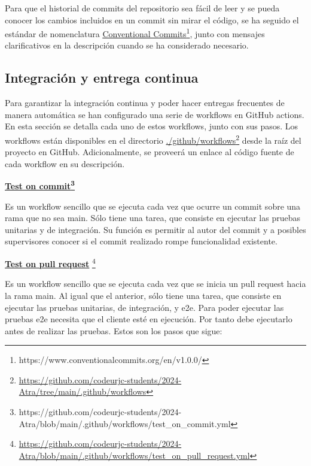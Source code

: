 Para que el historial de commits del repositorio sea fácil de leer y se pueda conocer los cambios incluidos en un commit sin mirar el código, se ha seguido el estándar de nomenclatura \href{https://www.conventionalcommits.org/en/v1.0.0/}{\uline{Conventional Commits}\footnote{\url{https://www.conventionalcommits.org/en/v1.0.0/}}}, junto con mensajes clarificativos en la descripción cuando se ha considerado necesario. 

\subsection{Integración y entrega continua} 
Para garantizar la integración continua y poder hacer entregas frecuentes de manera automática se han configurado una serie de workflows en GitHub actions. En esta sección se detalla cada uno de estos workflows, junto con sus pasos. Los workflows están disponibles en el directorio \href{https://github.com/codeurjc-students/2024-Atra/tree/main/.github/workflows}{./github/workflows}\footnote{\url{https://github.com/codeurjc-students/2024-Atra/tree/main/.github/workflows}} desde la raíz del proyecto en GitHub. Adicionalmente, se proveerá un enlace al código fuente de cada workflow en su descripción.

\textbf{\href{https://github.com/codeurjc-students/2024-Atra/blob/main/.github/workflows/test_on_commit.yml}{\uline{Test on commit}\footnote{\url{https://github.com/codeurjc-students/2024-Atra/blob/main/.github/workflows/test_on_commit.yml}}}}

\noindent Es un workflow sencillo que se ejecuta cada vez que ocurre un commit sobre una rama que no sea main. Sólo tiene una tarea, que consiste en ejecutar las pruebas unitarias y de integración. Su función es permitir al autor del commit y a posibles supervisores conocer si el commit realizado rompe funcionalidad existente.

\newpage

\textbf{\href{https://github.com/codeurjc-students/2024-Atra/blob/main/.github/workflows/test_on_pull_request.yml}{\uline{Test on pull request}}} \footnote{\url{https://github.com/codeurjc-students/2024-Atra/blob/main/.github/workflows/test_on_pull_request.yml}}

Es un workflow sencillo que se ejecuta cada vez que se inicia un pull request hacia la rama main. Al igual que el anterior, sólo tiene una tarea, que consiste en ejecutar las pruebas unitarias, de integración, y e2e. Para poder ejecutar las pruebas e2e necesita que el cliente esté en ejecución. Por tanto debe ejecutarlo antes de realizar las pruebas. Estos son los pasos que sigue:

